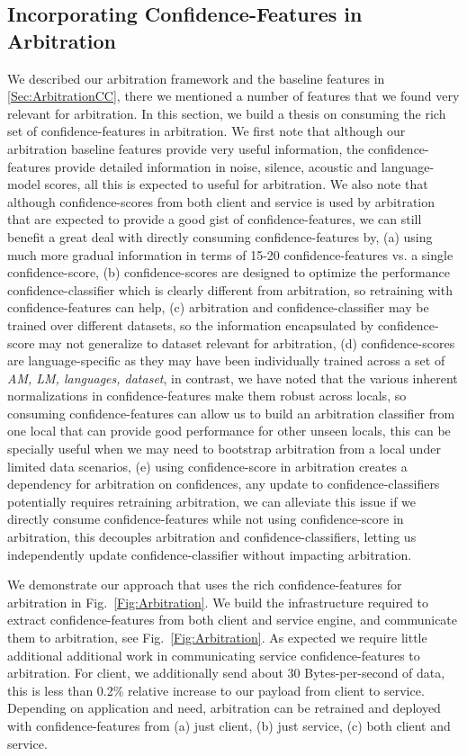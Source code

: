 \subsection{Incorporating Confidence-Features in Arbitration}
We described our arbitration framework and the baseline features in \ref{Sec:ArbitrationCC}, there we mentioned a number of features that we found very relevant for arbitration. In this section, we build a thesis on consuming the rich set of confidence-features in arbitration. We first note that although our arbitration baseline features provide very useful information, the confidence-features provide detailed information in noise, silence, acoustic and language-model scores, all this is expected to useful for arbitration. We also note that although confidence-scores from both client and service is used by arbitration that are expected to provide a good gist of confidence-features, we can still benefit a great deal with directly consuming confidence-features by, (a) using much more gradual information in terms of 15-20 confidence-features vs. a single confidence-score, (b) confidence-scores are designed to optimize the performance confidence-classifier which is clearly different from arbitration, so retraining with confidence-features can help, (c) arbitration and confidence-classifier may be trained over different datasets, so the information encapsulated by confidence-score may not generalize to dataset relevant for arbitration, (d) confidence-scores are language-specific as they may have been individually trained across a set of \emph{AM, LM, languages, dataset}, in contrast, we have noted that the various inherent normalizations in confidence-features make them robust across locals, so consuming confidence-features can allow us to build an arbitration classifier from one local that can provide good performance for other unseen locals, this can be specially useful when we may need to bootstrap arbitration from a local under limited data scenarios, (e) using confidence-score in arbitration creates a dependency for arbitration on confidences, any update to confidence-classifiers potentially requires retraining arbitration, we can alleviate this issue if we directly consume confidence-features while not using confidence-score in arbitration, this decouples arbitration and confidence-classifiers, letting us independently update confidence-classifier without impacting arbitration.

We demonstrate our approach that uses the rich confidence-features for arbitration in Fig.~\ref{Fig:Arbitration}. We build the infrastructure required to extract confidence-features from both client and service engine, and communicate them to arbitration, see Fig.~\ref{Fig:Arbitration}. As expected we require little additional additional work in communicating service confidence-features to arbitration. For client, we additionally send about 30 Bytes-per-second of data, this is less than 0.2\% relative increase to our payload from client to service. Depending on application and need, arbitration can be retrained and deployed with confidence-features from (a) just client, (b) just service, (c) both client and service. 

